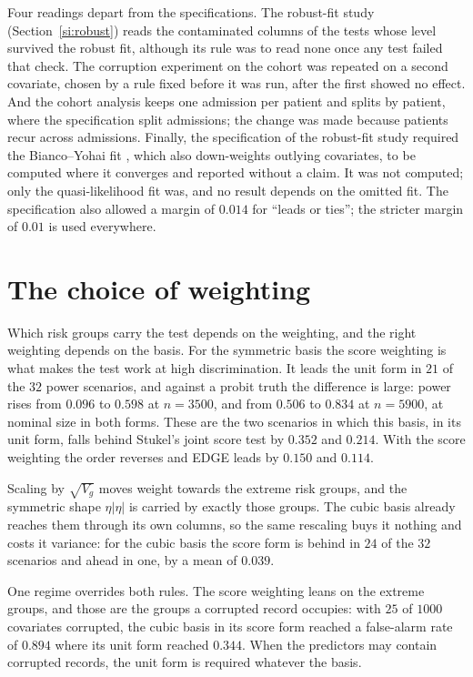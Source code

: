 \documentclass[11pt]{article}
\begin{document}
Four readings depart from the specifications. The robust-fit study (Section~\ref{si:robust}) reads
the contaminated columns of the tests whose level survived the robust fit, although its rule was to
read none once any test failed that check. The corruption experiment on the cohort was repeated on a
second covariate, chosen by a rule fixed before it was run, after the first showed no effect. And the
cohort analysis keeps one admission per patient and splits by patient, where the specification split
admissions; the change was made because patients recur across admissions. Finally, the specification
of the robust-fit study required the Bianco--Yohai fit \citep{bianco1996robust,croux2003implementing},
which also down-weights outlying covariates, to be computed where it converges and reported without a
claim. It was not computed; only the quasi-likelihood fit was, and no result depends on the omitted
fit. The specification also
allowed a margin of $0.014$ for ``leads or ties''; the stricter margin of $0.01$ is used everywhere.



\section{The choice of weighting}\label{si:weighting}

Which risk groups carry the test depends on the weighting, and the right weighting depends on the
basis. For the symmetric basis the score weighting is what makes the test work at high
discrimination. It leads the unit form in $21$ of the $32$ power scenarios, and against a probit truth
the difference is large: power rises from $0.096$ to $0.598$ at $n=3500$, and from $0.506$ to $0.834$
at $n=5900$, at nominal size in both forms. These are the two scenarios in which this basis, in its
unit form, falls behind Stukel's joint score test by $0.352$ and $0.214$. With the score weighting the
order reverses and EDGE leads by $0.150$ and $0.114$.

Scaling by $\sqrt{V_g}$ moves weight towards the extreme risk groups, and the symmetric shape
$\eta|\eta|$ is carried by exactly those groups. The cubic basis already reaches them through its own
columns, so the same rescaling buys it nothing and costs it variance: for the cubic basis the score
form is behind in $24$ of the $32$ scenarios and ahead in one, by a mean of $0.039$.

One regime overrides both rules. The score weighting leans on the extreme groups, and those are the
groups a corrupted record occupies: with $25$ of $1000$ covariates corrupted, the cubic basis in its
score form reached a false-alarm rate of $0.894$ where its unit form reached $0.344$. When the
predictors may contain corrupted records, the unit form is required whatever the basis.
\end{document}
